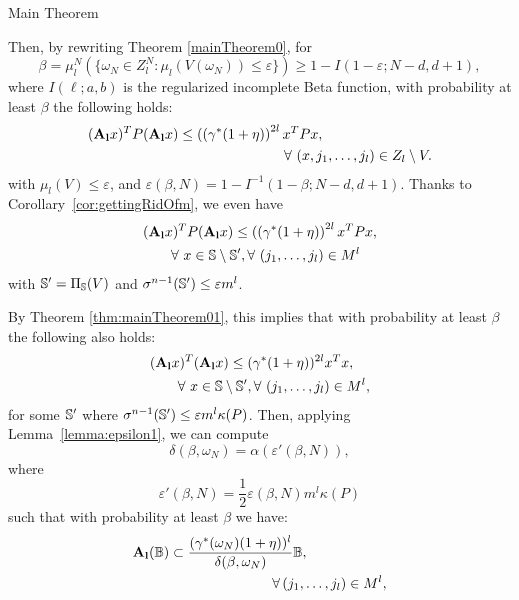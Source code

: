 \begin{subsection}{Main Theorem}
\begin{pf}
Then, by rewriting Theorem \ref{mainTheorem0}, for
\begin{equation}\label{eqn:violation2}
\beta = \mu_l^N \left( \{ \omega_N \in Z_l^N: \mu_l(V(\omega_N)) \leq \varepsilon \} \right) \geq 1- I(1-\varepsilon; N-d, d+1),
\end{equation}
where $I(\ell;a,b)$ is the regularized incomplete Beta function, with probability at least $\beta$ the following holds:
\begin{equation*} 
\begin{aligned}
& (\mathbf{A_l} x)^T P (\mathbf{A_l} x) \leq  \left((\gamma^{*}(1+\eta) \right)^{2l} x^T P x, \\
& \qquad \qquad \qquad \qquad \qquad \qquad \qquad \forall\ (x, j_1, \dots, j_l) \in Z_l \setminus V.
\end{aligned}
\end{equation*}
with $\mu_l(V) \leq \varepsilon$, and $\varepsilon(\beta, N)=1- I^{-1}(1-\beta; N-d, d+1)$. Thanks to Corollary~\ref{cor:gettingRidOfm}, we even have
\begin{equation*} 
\begin{aligned}
& (\mathbf{A_l} x)^T P (\mathbf{A_l} x) \leq  \left((\gamma^{*}(1+\eta) \right)^{2l} x^T P x, \\
& \qquad  \forall\ x \in \mathbb{S} \setminus \mathbb{S}', \forall\ (j_1, \dots, j_l) \in M^l
\end{aligned}
\end{equation*}
with $\mathbb{S}' = \Pi_{\mathbb{S}}(V)$ and $\sigma^{n-1}(\mathbb{S}') \leq \varepsilon m^l$.

By Theorem \ref{thm:mainTheorem01}, this implies that with probability at least $\beta$ the following also holds:
\begin{equation}
\begin{aligned}
& (\Al x)^T (\Al x) \leq ( \gamma^{*}(1+\eta) )^{2l} x^T x, \\
& \qquad   \forall\ x \in \sphere \setminus \sphere', \forall\ (j_1,\dots,j_l) \in M^l,
\end{aligned}
\end{equation}
for some $\mathbb{S}'$ where $\sigma^{n-1}(\mathbb{S}') \leq \varepsilon m^l \kappa(P)$. Then, applying Lemma~\ref{lemma:epsilon1}, we can compute
$$\delta(\beta, \omega_N) =\alpha(\varepsilon'(\beta,N)),$$
where
\begin{equation}\label{eqn:eps2}
\varepsilon'(\beta, N) = \frac{1}{2} \varepsilon(\beta,N) m^l \kappa(P) 
\end{equation} 
such that with probability at least $\beta$ we have:
\begin{equation*}
\begin{aligned}
& \mathbf{A_l} (\mathbb{B}) \subset \frac{(\gamma^{*}(\omega_N)(1+\eta))^l}{\delta(\beta, \omega_N)}\mathbb{B}, \\
& \qquad \qquad \qquad \qquad \qquad \forall\, (j_1,\dots,j_l) \in M^l,
\end{aligned}
\end{equation*}


\end{pf}
\end{subsection}
